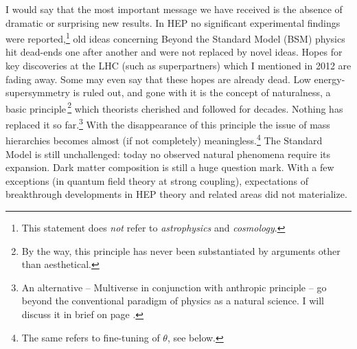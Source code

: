 \documentclass[epsfig,12pt]{article}
\begin{document}
I would say that the most important message we have received is the absence of dramatic or surprising new results. In HEP no significant experimental findings were reported,\footnote{This statement does {\em not} refer  
to {\em astrophysics} and {\em cosmology}.} old ideas concerning Beyond the Standard Model (BSM) physics hit dead-ends one after another and were not replaced by novel ideas. Hopes for key  discoveries at the LHC (such as superpartners) which I mentioned in 2012 are fading away. Some may even say that these hopes are already dead. 
 Low energy-supersymmetry is ruled out, and gone with it is the concept of naturalness, a basic principle\,\footnote{By the way, this principle has never been substantiated by arguments other than aesthetical.} which theorists cherished and followed  for decades. Nothing has replaced it so far.\footnote{An alternative -- Multiverse in conjunction with  anthropic principle -- go beyond the conventional paradigm of physics as a natural science. I will  discuss it in brief on page  \pageref{p14}.} With the disappearance of this principle the issue of mass hierarchies becomes almost (if not completely) meaningless.\footnote{The same refers to fine-tuning of $\theta$, see below.} 
The Standard Model is still unchallenged: today no observed natural phenomena require its expansion.  Dark matter composition is still a huge question mark.
With a few exceptions (in quantum field theory at strong coupling), expectations of breakthrough developments in HEP theory and related areas did not materialize.
\end{document}
